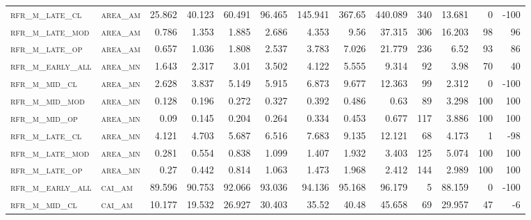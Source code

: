 \begin{landscape}
\begin{center}
\begin{footnotesize}
\begin{longtable}{llrrrrrrrr|rrr}
\textsc{rfr\_m\_late\_cl  } & \textsc{area\_am  }   & 25.862  & 40.123  & 60.491  & 96.465   & 145.941  & 367.65   & 440.089  & 340    & 13.681        & 0             & -100            \\
\textsc{rfr\_m\_late\_mod } & \textsc{area\_am  }   & 0.786   & 1.353   & 1.885   & 2.686    & 4.353    & 9.56     & 37.315   & 306    & 16.203        & 98            & 96              \\
\textsc{rfr\_m\_late\_op  } & \textsc{area\_am  }   & 0.657   & 1.036   & 1.808   & 2.537    & 3.783    & 7.026    & 21.779   & 236    & 6.52          & 93            & 86              \\
\textsc{rfr\_m\_early\_all} & \textsc{area\_mn  }   & 1.643   & 2.317   & 3.01    & 3.502    & 4.122    & 5.555    & 9.314    & 92     & 3.98          & 70            & 40              \\
\textsc{rfr\_m\_mid\_cl   } & \textsc{area\_mn  }   & 2.628   & 3.837   & 5.149   & 5.915    & 6.873    & 9.677    & 12.363   & 99     & 2.312         & 0             & -100            \\
\textsc{rfr\_m\_mid\_mod  } & \textsc{area\_mn  }   & 0.128   & 0.196   & 0.272   & 0.327    & 0.392    & 0.486    & 0.63     & 89     & 3.298         & 100           & 100             \\
\textsc{rfr\_m\_mid\_op   } & \textsc{area\_mn  }   & 0.09    & 0.145   & 0.204   & 0.264    & 0.334    & 0.453    & 0.677    & 117    & 3.886         & 100           & 100             \\
\textsc{rfr\_m\_late\_cl  } & \textsc{area\_mn  }   & 4.121   & 4.703   & 5.687   & 6.516    & 7.683    & 9.135    & 12.121   & 68     & 4.173         & 1             & -98             \\
\textsc{rfr\_m\_late\_mod } & \textsc{area\_mn  }   & 0.281   & 0.554   & 0.838   & 1.099    & 1.407    & 1.932    & 3.403    & 125    & 5.074         & 100           & 100             \\
\textsc{rfr\_m\_late\_op  } & \textsc{area\_mn  }   & 0.27    & 0.442   & 0.814   & 1.063    & 1.473    & 1.968    & 2.412    & 144    & 2.989         & 100           & 100             \\
\textsc{rfr\_m\_early\_all} & \textsc{cai\_am   }   & 89.596  & 90.753  & 92.066  & 93.036   & 94.136   & 95.168   & 96.179   & 5      & 88.159        & 0             & -100            \\
\textsc{rfr\_m\_mid\_cl   } & \textsc{cai\_am   }   & 10.177  & 19.532  & 26.927  & 30.403   & 35.52    & 40.48    & 45.658   & 69     & 29.957        & 47            & -6              \\

\end{longtable}
\end{footnotesize}
\end{center}
\end{landscape}
